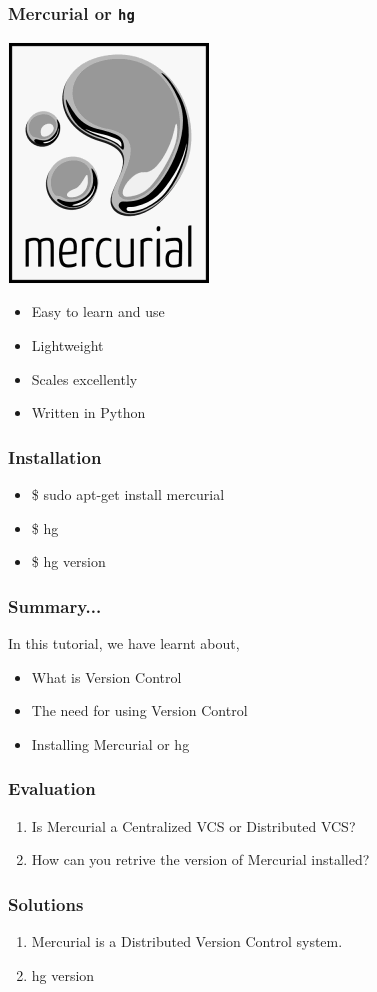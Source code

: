 \documentclass[17pt,compress]{beamer}
\newcommand{\typ}[1]{\lstinline{#1}}
\begin{document}
\begin{frame}[fragile]
  \frametitle{Mercurial or \typ{hg}}
  \centering
  \includegraphics[height=.70in,interpolate=true]{mercurial_logo}
  \begin{itemize}
  \item Easy to learn and use
  \item Lightweight
  \item Scales excellently
  \item Written in Python
  \end{itemize}
\end{frame}


\begin{frame}
  \frametitle{Installation}
  \begin{itemize}
  \item \$ sudo apt-get install mercurial
  \item \$ hg
  \item \$ hg version
  \end{itemize}
\end{frame}

\begin{frame}[fragile]
  \frametitle{Summary...}
  In this tutorial, we have learnt about,
  \begin{itemize}
  \item What is Version Control
  \item The need for using Version Control
  \item Installing Mercurial or hg
  \end{itemize}
\end{frame}

\begin{frame}[fragile]
  \frametitle{Evaluation}
  \begin{enumerate}
  \item Is Mercurial a Centralized VCS or Distributed VCS?
  \item How can you retrive the version of Mercurial installed?
  \end{enumerate}
\end{frame}

\begin{frame}
  \frametitle{Solutions}
  \begin{enumerate}
  \item Mercurial is a Distributed Version Control system.
  \item hg version 
  \end{enumerate}
\end{frame}
\end{document}
